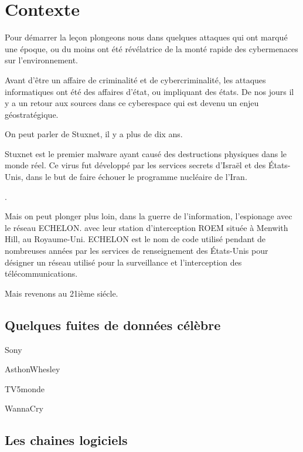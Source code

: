 
\section{Contexte}

Pour démarrer la leçon plongeons nous dans quelques attaques qui ont marqué une époque, ou du moins ont été révélatrice de la monté rapide des cybermenaces sur l'environnement.

Avant d'être un affaire de criminalité et de cybercriminalité, les attaques informatiques ont été des affaires d'état, ou impliquant des états. De nos jours il y a un retour aux sources dans ce cyberespace qui est devenu un enjeu géostratégique.

On peut parler de Stuxnet, il y a plus de dix ans.

Stuxnet est le premier malware ayant causé des destructions physiques dans le monde réel. Ce virus fut développé par les services secrets d'Israël et des États-Unis, dans le but de faire échouer le programme nucléaire de l'Iran.

.

Mais on peut plonger plus loin, dans la guerre de l'information, l'espionage avec le réseau ECHELON. avec leur station d'interception ROEM située à Menwith Hill, au Royaume-Uni.
ECHELON est le nom de code utilisé pendant de nombreuses années par les services de renseignement des États-Unis pour désigner un réseau utilisé pour la surveillance et l'interception des télécommunications.

Mais revenons au 21ième siécle.




\subsection{Quelques fuites de données célèbre}

Sony

AsthonWhesley


TV5monde

WannaCry 

\subsection{Les chaines logiciels}


